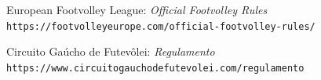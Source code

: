 \documentclass[a4paper,11pt]{article}
\begin{document}
\begin{thebibliography}{1}

  European Footvolley League:
  \textit{Official Footvolley Rules}
  \\\texttt{https://footvolleyeurope.com/official-footvolley-rules/}

  Circuito Gaúcho de Futevôlei:
  \textit{Regulamento}
  \\\texttt{https://www.circuitogauchodefutevolei.com/regulamento}
\end{thebibliography}
\end{document}
